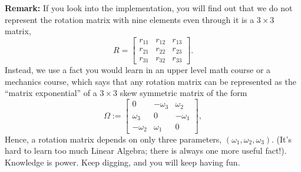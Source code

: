 \textbf{Remark:} If you look into the implementation, you will find out that we do not represent the rotation matrix with nine elements even through it is a $3 \times 3$ matrix, 
\begin{equation}
    R = \begin{bmatrix}
    r_{11} & r_{12} & r_{13} \\
    r_{21} & r_{22} & r_{23} \\
    r_{31} & r_{32} & r_{33}
    \end{bmatrix}.
\end{equation}
Instead, we use a fact you would learn in an upper level math course or a mechanics course, which says that any rotation matrix can be represented as the ``matrix exponential'' of a $3 \times 3$ skew symmetric matrix of the form
$$\Omega:=\left[ \begin{array}{ccc}0 & -\omega_3 & \omega_2 \\ \omega_3 & 0 & -\omega_1 \\ -\omega_2 & \omega_1 & 0 \end{array} \right], $$
Hence, a rotation matrix depends on only three parameters, $\left(\omega_1, \omega_2, \omega_3 \right)$. 
(It's hard to learn too much Linear Algebra; there is always one more useful fact!). Knowledge is power. Keep digging, and you will keep having fun.



